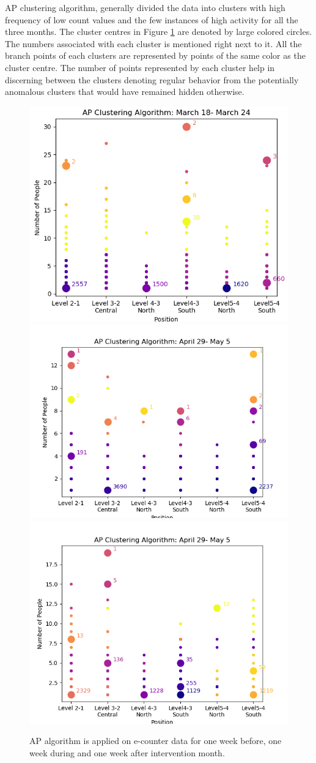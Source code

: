 AP clustering algorithm, generally divided the data into clusters with high frequency of low count values and the few instances of high activity for all the three months. The cluster centres in Figure \ref{oneweek} are denoted by large colored circles. The numbers associated with each cluster is mentioned right next to it. All the branch points of each clusters are represented by points of the same color as the cluster centre. The number of points represented by each cluster help in discerning between the clusters denoting regular behavior from the potentially anomalous clusters that would have remained hidden otherwise. 

\begin{figure}[!t]
\centering
\includegraphics[width=.41\textwidth]{image/Chapters/Chapter6/ApFirstWeekBeforeInt.png}
    \includegraphics[width=.49\textwidth]{image/Chapters/Chapter6/ApFirstWeekIntervention1.png}\hfill\centering
    \includegraphics[width=.5\textwidth]{image/Chapters/Chapter6/ApFirstWeekAfterInt.png}
    \\[\smallskipamount]
\caption{AP algorithm is applied on e-counter data for one week before, one week during and one week after intervention month. } 
\label{oneweek}
\end{figure}
 
